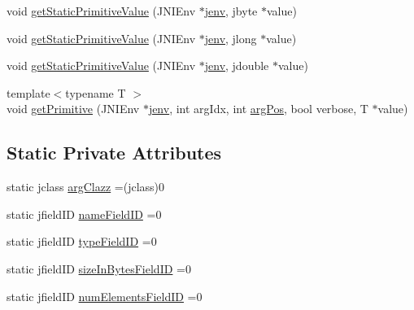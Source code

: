\begin{DoxyCompactItemize}
\item 
void \hyperlink{class_kernel_arg_a86d9b170e6049ea5419946abfb8630aa}{get\-Static\-Primitive\-Value} (J\-N\-I\-Env $\ast$\hyperlink{aparapi_8cpp_a31595c73e9a3750524b2ff61b5a14f96}{jenv}, jbyte $\ast$value)
\item 
void \hyperlink{class_kernel_arg_ac88ed8ecdb1b1386a1babce46a8fd82b}{get\-Static\-Primitive\-Value} (J\-N\-I\-Env $\ast$\hyperlink{aparapi_8cpp_a31595c73e9a3750524b2ff61b5a14f96}{jenv}, jlong $\ast$value)
\item 
void \hyperlink{class_kernel_arg_a33f565e75e4ab63bf9e575e34b8495d3}{get\-Static\-Primitive\-Value} (J\-N\-I\-Env $\ast$\hyperlink{aparapi_8cpp_a31595c73e9a3750524b2ff61b5a14f96}{jenv}, jdouble $\ast$value)
\item 
{\footnotesize template$<$typename T $>$ }\\void \hyperlink{class_kernel_arg_a051e9470c1ffcf16b8116fb29f6e0a94}{get\-Primitive} (J\-N\-I\-Env $\ast$\hyperlink{aparapi_8cpp_a31595c73e9a3750524b2ff61b5a14f96}{jenv}, int arg\-Idx, int \hyperlink{aparapi_8cpp_ab860a017c322839deee8d7bff5f0e180}{arg\-Pos}, bool verbose, T $\ast$value)
\end{DoxyCompactItemize}
\subsection*{Static Private Attributes}
\begin{DoxyCompactItemize}
\item 
static jclass \hyperlink{class_kernel_arg_a1535ba5730bc5280a108e0347796386b}{arg\-Clazz} =(jclass)0
\item 
static jfield\-I\-D \hyperlink{class_kernel_arg_a5e32c78d926203297ca649ef89c76675}{name\-Field\-I\-D} =0
\item 
static jfield\-I\-D \hyperlink{class_kernel_arg_a855049c3bb75ae01b1b7657735f91787}{type\-Field\-I\-D} =0
\item 
static jfield\-I\-D \hyperlink{class_kernel_arg_aa7895c0e36c36cee401c74462880da6c}{size\-In\-Bytes\-Field\-I\-D} =0
\item 
static jfield\-I\-D \hyperlink{class_kernel_arg_a7af62210bd435f167e7515c922567557}{num\-Elements\-Field\-I\-D} =0
\end{DoxyCompactItemize}


